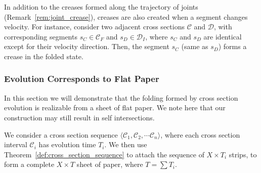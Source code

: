 \begin{proposition}
\label{prop:creases}
In addition to the creases formed along the trajectory of joints (Remark~\ref{rem:joint_crease}),
creases are also created when a segment changes velocity.
For instance, consider two adjacent cross sections $\mathcal C$ and $\mathcal D$,
with corresponding segments $s_C\in \mathcal C_F$ and $s_D\in \mathcal D_I$,
where $s_C$ and $s_D$ are identical except for their velocity direction.
Then, the segment $s_C$ (same as $s_D$) forms a crease in the folded state.
\end{proposition}

\subsubsection{Evolution Corresponds to Flat Paper}
\label{sec:flat}

In this section we will demonstrate that the folding formed by cross section evolution is realizable from a sheet of flat paper.
We note here that our construction may still result in self intersections.

We consider a cross section sequence $\langle \mathcal C_1, \mathcal C_2,\cdots \mathcal C_n \rangle$,
where each cross section interval $\mathcal C_i$ has evolution time $T_i$.
We then use Theorem~\ref{def:cross_section_sequence} to attach the sequence of $X\times T_i$ strips,
to form a complete $X\times T$ sheet of paper, where $T = \sum T_i$.

